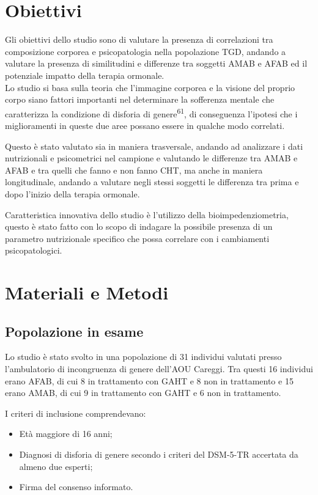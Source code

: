 \documentclass[12pt]{article}
\makeatletter
\newcommand{\cslcitation}[2]
 {\protect\hyper@linkstart{cite}{citeproc_bib_item_#1}#2\hyper@linkend}
\makeatother
\begin{document}
\section{Obiettivi}
\label{sec:orgda2c50e}
Gli obiettivi dello studio sono di valutare la presenza di correlazioni tra composizione corporea e psicopatologia nella popolazione TGD, andando a valutare la presenza di similitudini e differenze tra soggetti AMAB e AFAB ed il potenziale impatto della terapia ormonale.\\
Lo studio si basa sulla teoria che l'immagine corporea e la visione del proprio corpo siano fattori importanti nel determinare la sofferenza mentale che caratterizza la condizione di disforia di genere\textsuperscript{\cslcitation{61}{61}}, di conseguenza l'ipotesi che i miglioramenti in queste due aree possano essere in qualche modo correlati.

Questo è stato valutato sia in maniera trasversale, andando ad analizzare i dati nutrizionali e psicometrici nel campione e valutando le differenze tra AMAB e AFAB e tra quelli che fanno e non fanno CHT, ma anche in maniera longitudinale, andando a valutare negli stessi soggetti le differenza tra prima e dopo l'inizio della terapia ormonale.

Caratteristica innovativa dello studio è l'utilizzo della bioimpedenziometria, questo è stato fatto con lo scopo di indagare la possibile presenza di un parametro nutrizionale specifico che possa correlare con i cambiamenti psicopatologici.
\section{Materiali e Metodi}
\label{sec:orgc840ea6}
\subsection{Popolazione in esame}
\label{sec:orgef4a7f6}
Lo studio è stato svolto in una popolazione di 31 individui valutati presso l'ambulatorio di incongruenza di genere dell'AOU Careggi.
Tra questi 16 individui erano AFAB, di cui 8 in trattamento con GAHT e 8 non in trattamento e 15 erano AMAB, di cui 9 in trattamento con GAHT e 6 non in trattamento.

I criteri di inclusione comprendevano:
\begin{itemize}
\item Età maggiore di 16 anni;
\item Diagnosi di disforia di genere secondo i criteri del DSM-5-TR accertata da almeno due esperti;
\item Firma del consenso informato.
\end{itemize}
\end{document}
